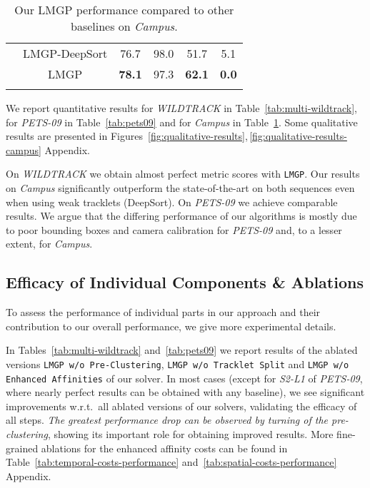 \begin{table}[!hbt]
{\begin{tabular}{c|c|c|c|c|c}
     \hdashline
      & LMGP-DeepSort                             &  76.7   &    98.0                       &       51.7                    &    5.1         \\
     & LMGP                               &  \textbf{78.1}   &    97.3                       &       \textbf{62.1}                    &     \textbf{0.0  }          \\\Xhline{2\arrayrulewidth}
  \end{tabular}}
\vspace{-0.1in}
\caption{Our LMGP performance compared to other baselines on \textit{Campus}.}
\label{tab:campus}
\end{table} 
\vspace{-0.2in}
We report quantitative results for \textit{WILDTRACK} in Table~\ref{tab:multi-wildtrack}, for \textit{PETS-09} in Table~\ref{tab:pets09}  and  for \textit{Campus} in Table~\ref{tab:campus}.
Some qualitative results are presented in Figures~\ref{fig:qualitative-results},\,\ref{fig:qualitative-results-campus} Appendix.

On \textit{WILDTRACK} we obtain almost perfect metric scores with \texttt{LMGP}. Our results on \textit{Campus} significantly outperform the state-of-the-art on both sequences even when using weak tracklets (DeepSort).
On \textit{PETS-09} we achieve comparable results.
We argue that the differing performance of our algorithms is mostly due to poor bounding boxes and camera calibration for \textit{PETS-09} and, to a lesser extent, for \textit{Campus}.
\subsection{Efficacy of Individual Components \& Ablations}
\label{sub:ablation-study}
To assess the performance of individual parts in our approach and their contribution to our overall performance, we give more experimental details.

In Tables~\ref{tab:multi-wildtrack} and~\ref{tab:pets09} we report results of the ablated versions \texttt{LMGP w/o Pre-Clustering}, \texttt{LMGP w/o Tracklet Split} and \texttt{LMGP w/o Enhanced Affinities} of our solver. 
In most cases (except for \textit{S2-L1} of \textit{PETS-09}, where nearly perfect results can be obtained with any baseline), we see significant improvements w.r.t.\ all ablated versions of our solvers, validating the efficacy of all steps. 
\textit{The greatest performance drop can be observed by turning of the pre-clustering}, showing its important role for obtaining improved results.
More fine-grained ablations for the enhanced affinity costs can be found in Table~\ref{tab:temporal-costs-performance} and~\ref{tab:spatial-costs-performance} Appendix.

